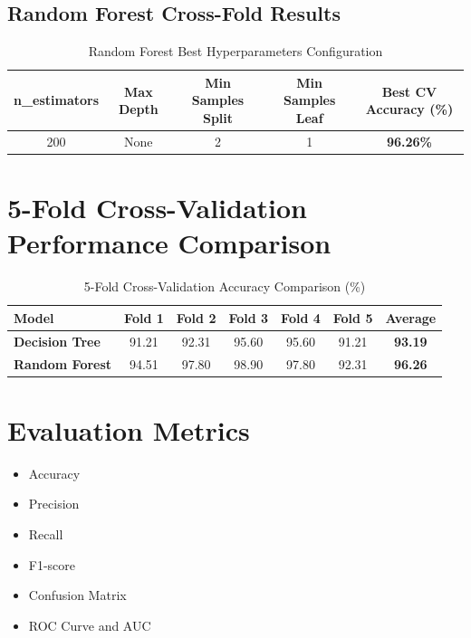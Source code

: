 \documentclass[11pt]{article}
\begin{document}
\subsection*{Random Forest Cross-Fold Results}
\begin{table}[H]
\centering
\caption{Random Forest Best Hyperparameters Configuration}
\begin{tabular}{ccccc}
\toprule
n\_estimators & Max Depth & Min Samples Split & Min Samples Leaf & Best CV Accuracy (\%) \\
\midrule
200 & None & 2 & 1 & \textbf{96.26\%} \\
\bottomrule
\end{tabular}
\end{table}


\section*{5-Fold Cross-Validation Performance Comparison}

\begin{table}[H]
\centering
\caption{5-Fold Cross-Validation Accuracy Comparison (\%)}
\begin{tabular}{lcccccc}
\toprule
Model & Fold 1 & Fold 2 & Fold 3 & Fold 4 & Fold 5 & Average \\
\midrule
\textbf{Decision Tree} & 91.21 & 92.31 & 95.60 & 95.60 & 91.21 & \textbf{93.19} \\
\textbf{Random Forest} & 94.51 & 97.80 & 98.90 & 97.80 & 92.31 & \textbf{96.26} \\
\bottomrule
\end{tabular}
\end{table}


\section*{Evaluation Metrics}
\begin{itemize}
    \item Accuracy
    \item Precision
    \item Recall
    \item F1-score
    \item Confusion Matrix
    \item ROC Curve and AUC
\end{itemize}
\end{document}
